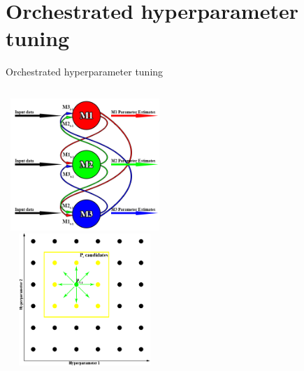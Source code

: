 \documentclass{beamer}
\begin{document}
\section{Orchestrated hyperparameter tuning}
\begin{frame}{Orchestrated hyperparameter tuning}
\begin{columns}[t]
	\centering
	\includegraphics[width=6cm,height=5cm]{orchestrated_tuning_methodology}\\
	\centering
	\includegraphics[width=6cm,height=5cm]{search_grid}\\
\end{columns}
\end{frame}
\end{document}
